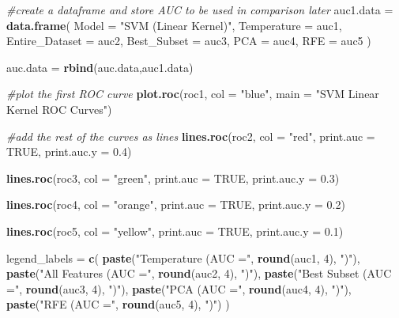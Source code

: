 \documentclass[
]{article}
\newenvironment{Shaded}{\begin{snugshade}}{\end{snugshade}}
\newcommand{\AttributeTok}[1]{\textcolor[rgb]{0.13,0.29,0.53}{#1}}
\newcommand{\CommentTok}[1]{\textcolor[rgb]{0.56,0.35,0.01}{\textit{#1}}}
\newcommand{\ConstantTok}[1]{\textcolor[rgb]{0.56,0.35,0.01}{#1}}
\newcommand{\DecValTok}[1]{\textcolor[rgb]{0.00,0.00,0.81}{#1}}
\newcommand{\FloatTok}[1]{\textcolor[rgb]{0.00,0.00,0.81}{#1}}
\newcommand{\FunctionTok}[1]{\textcolor[rgb]{0.13,0.29,0.53}{\textbf{#1}}}
\newcommand{\NormalTok}[1]{#1}
\newcommand{\OtherTok}[1]{\textcolor[rgb]{0.56,0.35,0.01}{#1}}
\newcommand{\StringTok}[1]{\textcolor[rgb]{0.31,0.60,0.02}{#1}}
\begin{document}
\begin{Shaded}
\begin{Highlighting}[]
\CommentTok{\#create a dataframe and store AUC to be used in comparison later}
\NormalTok{auc1.data }\OtherTok{=} \FunctionTok{data.frame}\NormalTok{(}
  \AttributeTok{Model =} \StringTok{"SVM (Linear Kernel)"}\NormalTok{,}
  \AttributeTok{Temperature =}\NormalTok{ auc1,}
  \AttributeTok{Entire\_Dataset =}\NormalTok{ auc2,}
  \AttributeTok{Best\_Subset =}\NormalTok{ auc3,}
  \AttributeTok{PCA =}\NormalTok{ auc4,}
  \AttributeTok{RFE =}\NormalTok{ auc5}
\NormalTok{)}

\NormalTok{auc.data }\OtherTok{=} \FunctionTok{rbind}\NormalTok{(auc.data,auc1.data)}


\CommentTok{\#plot the first ROC curve}
\FunctionTok{plot.roc}\NormalTok{(roc1, }\AttributeTok{col =} \StringTok{"blue"}\NormalTok{, }\AttributeTok{main =} \StringTok{"SVM Linear Kernel ROC Curves"}\NormalTok{)}

\CommentTok{\#add the rest of the curves as lines}
\FunctionTok{lines.roc}\NormalTok{(roc2, }\AttributeTok{col =} \StringTok{"red"}\NormalTok{, }\AttributeTok{print.auc =} \ConstantTok{TRUE}\NormalTok{, }\AttributeTok{print.auc.y =} \FloatTok{0.4}\NormalTok{)}

\FunctionTok{lines.roc}\NormalTok{(roc3, }\AttributeTok{col =} \StringTok{"green"}\NormalTok{, }\AttributeTok{print.auc =} \ConstantTok{TRUE}\NormalTok{, }\AttributeTok{print.auc.y =} \FloatTok{0.3}\NormalTok{)}

\FunctionTok{lines.roc}\NormalTok{(roc4, }\AttributeTok{col =} \StringTok{"orange"}\NormalTok{, }\AttributeTok{print.auc =} \ConstantTok{TRUE}\NormalTok{, }\AttributeTok{print.auc.y =} \FloatTok{0.2}\NormalTok{)}

\FunctionTok{lines.roc}\NormalTok{(roc5, }\AttributeTok{col =} \StringTok{"yellow"}\NormalTok{, }\AttributeTok{print.auc =} \ConstantTok{TRUE}\NormalTok{, }\AttributeTok{print.auc.y =} \FloatTok{0.1}\NormalTok{)}

\NormalTok{legend\_labels }\OtherTok{=} \FunctionTok{c}\NormalTok{(}
  \FunctionTok{paste}\NormalTok{(}\StringTok{"Temperature (AUC ="}\NormalTok{, }\FunctionTok{round}\NormalTok{(auc1, }\DecValTok{4}\NormalTok{), }\StringTok{")"}\NormalTok{),}
  \FunctionTok{paste}\NormalTok{(}\StringTok{"All Features (AUC ="}\NormalTok{, }\FunctionTok{round}\NormalTok{(auc2, }\DecValTok{4}\NormalTok{), }\StringTok{")"}\NormalTok{),}
  \FunctionTok{paste}\NormalTok{(}\StringTok{"Best Subset (AUC ="}\NormalTok{, }\FunctionTok{round}\NormalTok{(auc3, }\DecValTok{4}\NormalTok{), }\StringTok{")"}\NormalTok{),}
  \FunctionTok{paste}\NormalTok{(}\StringTok{"PCA (AUC ="}\NormalTok{, }\FunctionTok{round}\NormalTok{(auc4, }\DecValTok{4}\NormalTok{), }\StringTok{")"}\NormalTok{),}
  \FunctionTok{paste}\NormalTok{(}\StringTok{"RFE (AUC ="}\NormalTok{, }\FunctionTok{round}\NormalTok{(auc5, }\DecValTok{4}\NormalTok{), }\StringTok{")"}\NormalTok{)}
\NormalTok{)}


\end{Highlighting}
\end{Shaded}
\end{document}

